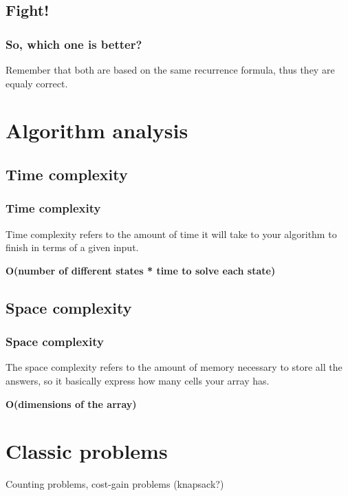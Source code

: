 \documentclass[article]{beamer}
\begin{document}
\subsection{Fight!}
\begin{frame}
	\frametitle{So, which one is better?}
	Remember that both are based on the same recurrence formula, thus they are equaly correct.
\end{frame}

\section{Algorithm analysis}

\subsection{Time complexity}
\begin{frame}
	\frametitle{Time complexity}
	Time complexity refers to the amount of time it will take to your algorithm to finish in terms of a given input. 
	
	\vspace{8mm}	
	
	\textbf{O(number of different states * time to solve each state)}
\end{frame}

\subsection{Space complexity}
\begin{frame}
	\frametitle{Space complexity}
	The space complexity refers to the amount of memory necessary to store all the answers, so it basically express how many cells your array has.
	
	\vspace{8mm}
	
	\textbf{O(dimensions of the array)}
\end{frame}

\section{Classic problems}
\begin{frame}
	Counting problems, cost-gain problems (knapsack?)
\end{frame}
\end{document}
